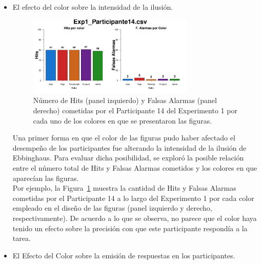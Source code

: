 \begin{itemize}
	\item El efecto del color sobre la intensidad de la ilusión.

\begin{figure}[th]
\centering
\includegraphics[width=0.75\textwidth]{Figures/Color_Exp1_P14}
\decoRule
\caption[Explorando datos individuales (ejemplo): Relación entre los Hits y las Falsas Alarmas registradas y el color de las figuras]{Número de Hits (panel izquierdo) y Falsas Alarmas (panel derecho) cometidas por el Participante 14 del Experimento 1 por cada uno de los colores en que se presentaron las figuras.}
\label{fig:Color_E1_P14}
\end{figure}


Una primer forma en que el color de las figuras pudo haber afectado el desempeño de los participantes fue alterando la intensidad de la ilusión de Ebbinghaus. Para evaluar dicha posibilidad, se exploró la posible relación entre el número total de Hits y Falsas Alarmas cometidos y los colores en que aparecían las figuras.\\

Por ejemplo, la Figura~\ref{fig:Color_E1_P14} muestra la cantidad de Hits y Falsas Alarmas cometidas por el Participante 14 a lo largo del Experimento 1 por cada color empleado en el diseño de las figuras (panel izquierdo y derecho, respectivamente). De acuerdo a lo que se observa, no parece que el color haya tenido un efecto sobre la precisión con que este participante respondía a la tarea.\\


	\item El Efecto del Color sobre la emisión de respuestas en los participantes.


\end{itemize}
